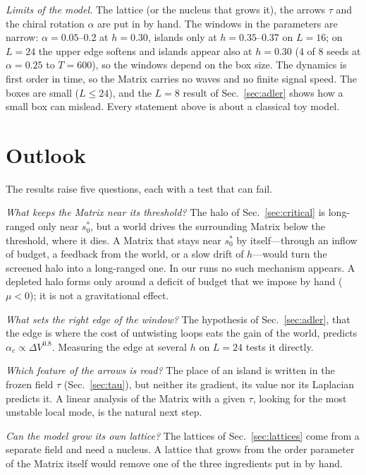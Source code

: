 \documentclass[reprint,pre,amsmath,amssymb,superscriptaddress,nofootinbib]{revtex4-2}
\newcommand{\szc}{s_0^{*}}
\begin{document}
\emph{Limits of the model.} The lattice (or the nucleus that grows it), the arrows $\tau$ and the chiral rotation $\alpha$ are put in by hand. The windows in the parameters are narrow: $\alpha=0.05$--0.2 at $h=0.30$, islands only at $h=0.35$--0.37 on $L=16$; on $L=24$ the upper edge softens and islands appear also at $h=0.30$ (4 of 8 seeds at $\alpha=0.25$ to $T=600$), so the windows depend on the box size. The dynamics is first order in time, so the Matrix carries no waves and no finite signal speed. The boxes are small ($L\le24$), and the $L=8$ result of Sec.~\ref{sec:adler} shows how a small box can mislead. Every statement above is about a classical toy model.

\section{Outlook}\label{sec:outlook}

The results raise five questions, each with a test that can fail.

\emph{What keeps the Matrix near its threshold?} The halo of Sec.~\ref{sec:critical} is long-ranged only near $\szc$, but a world drives the surrounding Matrix below the threshold, where it dies. A Matrix that stays near $\szc$ by itself---through an inflow of budget, a feedback from the world, or a slow drift of $h$---would turn the screened halo into a long-ranged one. In our runs no such mechanism appears. A depleted halo forms only around a deficit of budget that we impose by hand ($\mu<0$); it is not a gravitational effect.

\emph{What sets the right edge of the window?} The hypothesis of Sec.~\ref{sec:adler}, that the edge is where the cost of untwisting loops eats the gain of the world, predicts $\alpha_c\propto\Delta V^{0.8}$. Measuring the edge at several $h$ on $L=24$ tests it directly.

\emph{Which feature of the arrows is read?} The place of an island is written in the frozen field $\tau$ (Sec.~\ref{sec:tau}), but neither its gradient, its value nor its Laplacian predicts it. A linear analysis of the Matrix with a given $\tau$, looking for the most unstable local mode, is the natural next step.

\emph{Can the model grow its own lattice?} The lattices of Sec.~\ref{sec:lattices} come from a separate field and need a nucleus. A lattice that grows from the order parameter of the Matrix itself would remove one of the three ingredients put in by hand.
\end{document}
